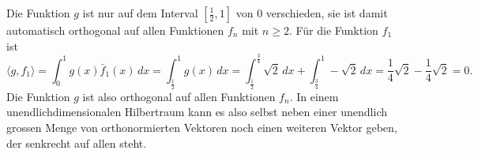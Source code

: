 \begin{beispiel}
Die Funktion $g$ ist nur auf dem Interval $[\frac12,1]$ von $0$ verschieden,
sie ist damit automatisch orthogonal auf allen Funktionen $f_n$ mit $n\ge 2$.
Für die Funktion $f_1$ ist
\[
\langle g,f_1\rangle
=
\int_0^1 g(x)\bar{f}_1(x)\,dx
=
\int_{\frac12}^1 g(x)\,dx
=
\int_{\frac12}^{\frac34}\sqrt{2}\,dx
+
\int_{\frac34}^1-\sqrt{2}\,dx
=
\frac14 \sqrt{2} - \frac14 \sqrt{2} = 0.
\]
Die Funktion $g$ ist also orthogonal auf allen Funktionen $f_n$.
In einem unendlichdimensionalen Hilbertraum kann es also selbst
neben einer unendlich grossen Menge von orthonormierten Vektoren 
noch einen weiteren Vektor geben, der senkrecht auf allen steht.
\end{beispiel}





